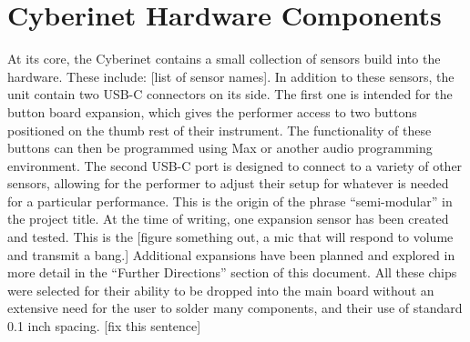 





\chapter{Cyberinet Hardware Components}

At its core, the Cyberinet contains a small collection of sensors build into the hardware. These include: [list of sensor names]. In addition to these sensors, the unit contain two USB-C connectors on its side. The first one is intended for the button board expansion, which gives the performer access to two buttons positioned on the thumb rest of their instrument. The functionality of these buttons can then be programmed using Max or another audio programming environment. The second USB-C port is designed to connect to a variety of other sensors, allowing for the performer to adjust their setup for whatever is needed for a particular performance. This is the origin of the phrase “semi-modular” in the project title. At the time of writing, one expansion sensor has been created and tested. This is the [figure something out, a mic that will respond to volume and transmit a bang.] Additional expansions have been planned and explored in more detail in the “Further Directions” section of this document. 
All these chips were selected for their ability to be dropped into the main board without an extensive need for the user to solder many components, and their use of standard 0.1 inch spacing. [fix this sentence]

